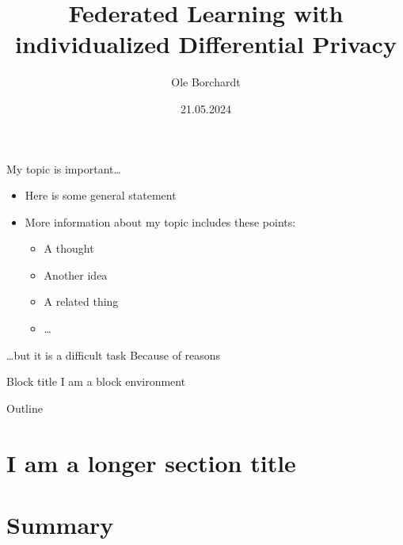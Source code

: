 \documentclass[aspectratio=169]{beamer}
\title{Federated Learning with individualized Differential Privacy}
\subtitle{}
\author{Ole Borchardt}
\institute{Database Group\\University of Leipzig}
\date{21.05.2024}
\begin{document}
  
  
\maketitlepage
  
  
\begin{frame}{My topic is important\dots }
\begin{itemize}
  \item Here is some general statement 
  \item More information about my topic includes these points: 
    \begin{itemize}
      \item A thought
      \item Another idea
      \item A related thing 
      \item \dots
    \end{itemize}
\end{itemize}
\end{frame}


\begin{frame}{\dots but it is a difficult task}
  Because of reasons
  \begin{block}{Block title}
    I am a block environment 
  \end{block}
\end{frame}


\begin{frame}{Outline}
\tableofcontents[hideallsubsections]
\end{frame}


\section[A short section title]{I am a longer section title}

\begin{frame}

\end{frame}


\section{Summary}


\begin{frame}

\end{frame}

\begin{frame}

\end{frame}

\begin{frame}

\end{frame}

\begin{frame}

\end{frame}

\begin{frame}

\end{frame}
\end{document}
